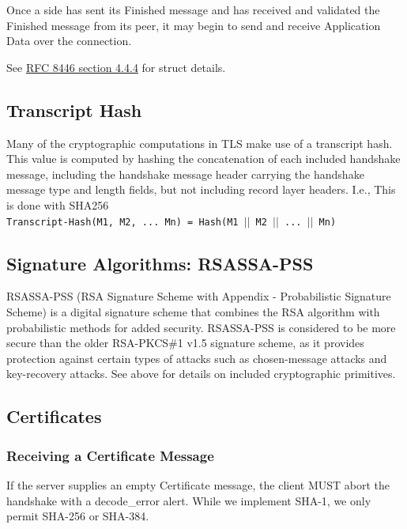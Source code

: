 \documentclass{article}
\begin{document}
Once a side has sent its Finished message and has received and validated the Finished message from its peer,
it may begin to send and receive Application Data over the connection.

See \href{https://datatracker.ietf.org/doc/html/rfc8446#section-4.4.4}{RFC 8446 section 4.4.4\tiny\faExternalLink} for struct details.

\subsection{Transcript Hash}
Many of the cryptographic computations in TLS make use of a
transcript hash.  This value is computed by hashing the concatenation
of each included handshake message, including the handshake message
header carrying the handshake message type and length fields, but not
including record layer headers.  I.e., This is done with SHA256\\

\texttt{Transcript-Hash(M1, M2, ... Mn) = Hash(M1 $||$ M2 $||$ ... $||$ Mn)}

\subsection{Signature Algorithms: RSASSA-PSS}
RSASSA-PSS (RSA Signature Scheme with Appendix - Probabilistic Signature Scheme) is a digital signature scheme that combines the RSA algorithm with probabilistic methods for added security.
RSASSA-PSS is considered to be more secure than the older RSA-PKCS\#1 v1.5 signature scheme,
as it provides protection against certain types of attacks such as chosen-message attacks and key-recovery attacks.
See above for details on included cryptographic primitives.

\subsection{Certificates}


\subsubsection{Receiving a Certificate Message}
If the server supplies an empty Certificate message, the client MUST abort the handshake with a decode\_error alert.
While we implement SHA-1, we only permit SHA-256 or SHA-384.
\end{document}
